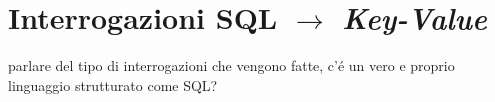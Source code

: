 \chapter{Interrogazioni SQL $\to$ \emph{Key-Value}}
parlare del tipo di interrogazioni che vengono fatte,
c'é un vero e proprio linguaggio strutturato come SQL?
